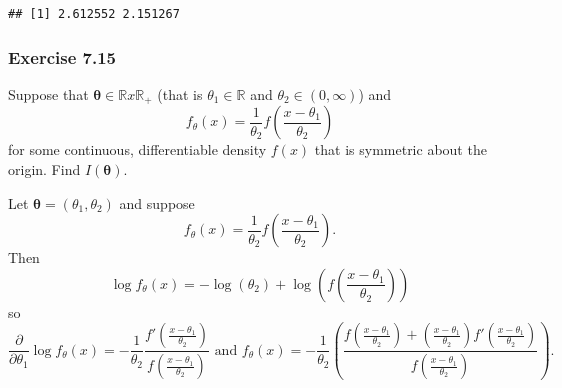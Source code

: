 \documentclass[12pt,]{article}
\newenvironment{Shaded}{\begin{snugshade}}{\end{snugshade}}
\newcommand{\CommentTok}[1]{\textcolor[rgb]{0.56,0.35,0.01}{\textit{#1}}}
\newcommand{\ControlFlowTok}[1]{\textcolor[rgb]{0.13,0.29,0.53}{\textbf{#1}}}
\newcommand{\DataTypeTok}[1]{\textcolor[rgb]{0.13,0.29,0.53}{#1}}
\newcommand{\DecValTok}[1]{\textcolor[rgb]{0.00,0.00,0.81}{#1}}
\newcommand{\KeywordTok}[1]{\textcolor[rgb]{0.13,0.29,0.53}{\textbf{#1}}}
\newcommand{\NormalTok}[1]{#1}
\newcommand{\OperatorTok}[1]{\textcolor[rgb]{0.81,0.36,0.00}{\textbf{#1}}}
\newcommand{\StringTok}[1]{\textcolor[rgb]{0.31,0.60,0.02}{#1}}
\begin{document}
\begin{Shaded}
\end{Shaded}

\begin{verbatim}
## [1] 2.612552 2.151267
\end{verbatim}

\hypertarget{exercise-7.15}{%
\subsubsection{Exercise 7.15}\label{exercise-7.15}}

Suppose that \(\boldsymbol\theta \in \mathbb{R}x\mathbb{R_+}\) (that is
\(\theta_1\in \mathbb{R}\) and \(\theta_2 \in (0,\infty)\)) and
\[f_\theta(x)=\frac{1}{\theta_2}f\left(\frac{x-\theta_1}{\theta_2}\right)\]
for some continuous, differentiable density \(f(x)\) that is symmetric
about the origin. Find \(I(\boldsymbol\theta)\).

Let \(\boldsymbol \theta = (\theta_1, \theta_2)\) and suppose
\[f_\theta(x)=\frac{1}{\theta_2}f\left(\frac{x-\theta_1}{\theta_2}\right).\]
Then
\[\log f_\theta(x)=-\log(\theta_2)+\log\left(f\left(\frac{x-\theta_1}{\theta_2}\right)\right)\]
so
\[\frac{\partial}{\partial\theta_1}\log f_\theta(x)=-\frac{1}{\theta_2}\frac{f'\left(\frac{x-\theta_1}{\theta_2}\right)}{f\left(\frac{x-\theta_1}{\theta_2}\right)} \text{ and } f_\theta(x)=-\frac{1}{\theta_2}\left(\frac{f\left(\frac{x-\theta_1}{\theta_2}\right)+\left(\frac{x-\theta_1}{\theta_2}\right)f'\left(\frac{x-\theta_1}{\theta_2}\right)}{f\left(\frac{x-\theta_1}{\theta_2}\right)}\right).\]
\end{document}
